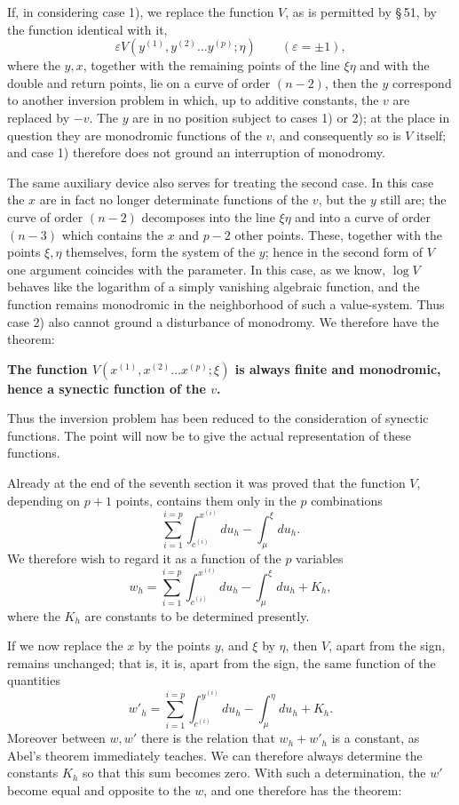 \documentclass[10pt]{article}
\begin{document}
If, in considering case 1), we replace the function \(V\), as is permitted by \S\,51, by the function identical with it,
\[
\varepsilon V(y^{(1)},y^{(2)}\ldots y^{(p)};\eta)\qquad(\varepsilon=\pm1),
\]
where the \(y,x\), together with the remaining points of the line \(\xi\eta\) and with the double and return points, lie on a curve of order \((n-2)\), then the \(y\) correspond to another inversion problem in which, up to additive constants, the \(v\) are replaced by \(-v\). The \(y\) are in no position subject to cases 1) or 2); at the place in question they are monodromic functions of the \(v\), and consequently so is \(V\) itself; and case 1) therefore does not ground an interruption of monodromy.

The same auxiliary device also serves for treating the second case. In this case the \(x\) are in fact no longer determinate functions of the \(v\), but the \(y\) still are; the curve of order \((n-2)\) decomposes into the line \(\xi\eta\) and into a curve of order \((n-3)\) which contains the \(x\) and \(p-2\) other points. These, together with the points \(\xi,\eta\) themselves, form the system of the \(y\); hence in the second form of \(V\) one argument coincides with the parameter. In this case, as we know, \(\log V\) behaves like the logarithm of a simply vanishing algebraic function, and the function remains monodromic in the neighborhood of such a value-system. Thus case 2) also cannot ground a disturbance of monodromy. We therefore have the theorem:

\textbf{The function \(V(x^{(1)},x^{(2)}\ldots x^{(p)};\xi)\) is always finite and monodromic, hence a synectic function of the \(v\).}

Thus the inversion problem has been reduced to the consideration of synectic functions. The point will now be to give the actual representation of these functions.

Already at the end of the seventh section it was proved that the function \(V\), depending on \(p+1\) points, contains them only in the \(p\) combinations
\[
\sum_{i=1}^{i=p}\int_{c^{(i)}}^{x^{(i)}}du_h-\int_{\mu}^{\xi}du_h.
\]
We therefore wish to regard it as a function of the \(p\) variables
\[
w_h=\sum_{i=1}^{i=p}\int_{c^{(i)}}^{x^{(i)}}du_h-\int_{\mu}^{\xi}du_h+K_h,
\]
where the \(K_h\) are constants to be determined presently.

If we now replace the \(x\) by the points \(y\), and \(\xi\) by \(\eta\), then \(V\), apart from the sign, remains unchanged; that is, it is, apart from the sign, the same function of the quantities
\[
w'_h=\sum_{i=1}^{i=p}\int_{c^{(i)}}^{y^{(i)}}du_h-\int_{\mu}^{\eta}du_h+K_h.
\]
Moreover between \(w,w'\) there is the relation that \(w_h+w'_h\) is a constant, as Abel's theorem immediately teaches. We can therefore always determine the constants \(K_h\) so that this sum becomes zero. With such a determination, the \(w'\) become equal and opposite to the \(w\), and one therefore has the theorem:
\end{document}
